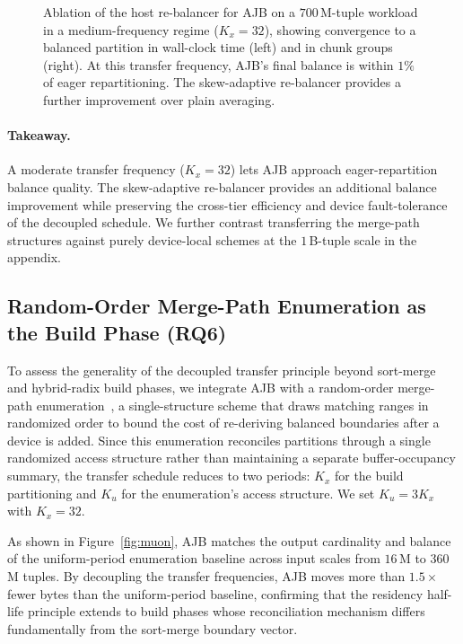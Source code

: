 \documentclass{article}
\begin{document}
\begin{figure}[t]
\centering
\caption{Ablation of the host re-balancer for AJB on a $700$\,M-tuple workload
in a medium-frequency regime ($K_x = 32$), showing convergence to a balanced
partition in wall-clock time (left) and in chunk groups (right). At this
transfer frequency, AJB's final balance is within $1\%$ of eager repartitioning.
The skew-adaptive re-balancer provides a further improvement over plain
averaging.}
\label{fig:nesterov}
\end{figure}

\paragraph{Takeaway.}
A moderate transfer frequency ($K_x = 32$) lets AJB approach eager-repartition
balance quality. The skew-adaptive re-balancer provides an additional balance
improvement while preserving the cross-tier efficiency and device
fault-tolerance of the decoupled schedule. We further contrast transferring the
merge-path structures against purely device-local schemes at the $1$\,B-tuple
scale in the appendix.

\subsection{Random-Order Merge-Path Enumeration as the Build Phase (RQ6)}
\label{sec:rq6}

To assess the generality of the decoupled transfer principle beyond sort-merge
and hybrid-radix build phases, we integrate AJB with a random-order merge-path
enumeration~\citep{chen2023renum}, a single-structure scheme that draws matching
ranges in randomized order to bound the cost of re-deriving balanced boundaries
after a device is added. Since this enumeration reconciles partitions through a
single randomized access structure rather than maintaining a separate
buffer-occupancy summary, the transfer schedule reduces to two periods: $K_x$
for the build partitioning and $K_u$ for the enumeration's access structure. We
set $K_u = 3K_x$ with $K_x = 32$.

As shown in Figure~\ref{fig:muon}, AJB matches the output cardinality and balance
of the uniform-period enumeration baseline across input scales from $16$\,M to
$360$\,M tuples. By decoupling the transfer frequencies, AJB moves more than
$1.5\times$ fewer bytes than the uniform-period baseline, confirming that the
residency half-life principle extends to build phases whose reconciliation
mechanism differs fundamentally from the sort-merge boundary vector.
\end{document}
